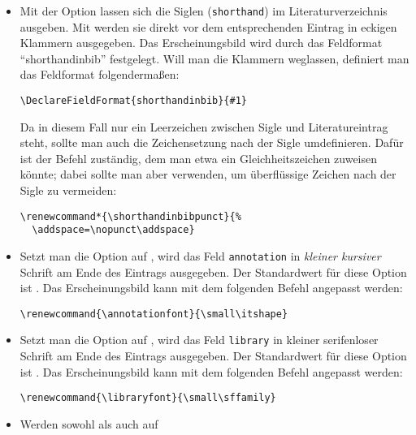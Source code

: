 \documentclass[ngerman]{scrartcl}
\begin{document}
\begin{itemize}
\begin{lstlisting}
\renewcommand*{\sernumstring}{%
  \addcomma\space\bibstring{volume}\addspace}
				\end{lstlisting}
        Das würde \enquote{(Reihentitel, Bd. N)} ergeben.
  \item Mit der Option 
	      lassen sich die Siglen (\texttt{shorthand}) im Literaturverzeichnis
				ausgeben. Mit  werden sie direkt vor dem
				entsprechenden Eintrag in eckigen Klammern ausgegeben. Das Erscheinungsbild
				wird durch das Feldformat \enquote{shorthandinbib} festgelegt. Will man
				die Klammern weglassen, definiert man das Feldformat folgendermaßen:
				\begin{lstlisting}
\DeclareFieldFormat{shorthandinbib}{#1}
				\end{lstlisting}
				Da in diesem Fall nur ein Leerzeichen zwischen Sigle und Literatureintrag
				steht, sollte man auch die Zeichensetzung nach der Sigle umdefinieren. Dafür 
				ist der Befehl  zuständig, dem man etwa ein
				Gleichheitszeichen zuweisen könnte; dabei sollte man aber 
				verwenden, um überflüssige Zeichen nach der Sigle zu vermeiden:
				\begin{lstlisting}
\renewcommand*{\shorthandinbibpunct}{%
  \addspace=\nopunct\addspace}
				\end{lstlisting}
	\item Setzt
	      man die Option  auf
	      , wird das Feld \texttt{annotation} in 
	      \textit{\small kleiner kursiver} Schrift am Ende des Eintrags
	      ausgegeben. Der Standardwert für diese Option ist .
	      Das Erscheinungsbild kann mit dem folgenden Befehl angepasst werden:
				\begin{lstlisting}
\renewcommand{\annotationfont}{\small\itshape}
				\end{lstlisting}
	\item Setzt
	      man die Option  auf
	      , wird das Feld \texttt{library} in 
	      {\small\sffamily  kleiner serifenloser} Schrift am Ende des Eintrags
	      ausgegeben. Der Standardwert für diese Option ist .
	      Das Erscheinungsbild kann mit dem folgenden Befehl angepasst werden:
				\begin{lstlisting}
\renewcommand{\libraryfont}{\small\sffamily}
				\end{lstlisting}
	\item Werden sowohl  als auch  auf

\end{itemize}
\end{document}

